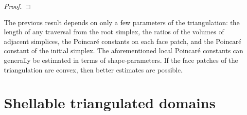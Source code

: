 \documentclass[a4paper]{amsart}
\begin{document}
\begin{proof}
\end{proof}

\begin{remark}
    The previous result depends on only a few parameters of the triangulation:
    the length of any traversal from the root simplex,
    the ratios of the volumes of adjacent simplices,
    the Poincar\'e constants on each face patch, and the Poincar\'e constant of the initial simplex. 
    The aforementioned local Poincar\'e constants can generally be estimated in terms of shape-parameters. 
    If the face patches of the triangulation are convex, then better estimates are possible. 
\end{remark}




\newpage

\section{Shellable triangulated domains}
\end{document}
